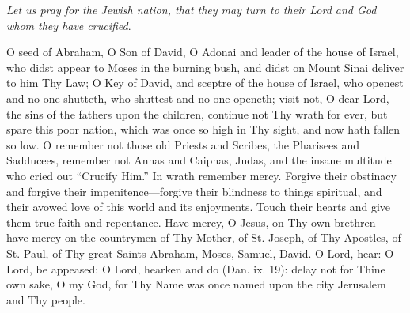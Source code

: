 \emph{Let us pray for the Jewish
nation, that they may turn to their Lord and God whom they have crucified}.

O seed of Abraham, O Son of
David, O Adonai and leader of the house of Israel, who didst appear to
Moses in the burning bush, and didst on Mount Sinai deliver to him Thy
Law; O Key of David, and sceptre of the house of Israel, who openest and
no one shutteth, who shuttest and no one openeth; visit not, O dear
Lord, the sins of the fathers upon the children, continue not Thy wrath
for ever, but spare this poor nation, which was once so high in Thy
sight, and now hath fallen so low. O remember not those old Priests and
Scribes, the Pharisees and Sadducees, remember not Annas and Caiphas,
Judas, and the insane multitude who cried out ``Crucify Him.'' In wrath
remember mercy. Forgive their obstinacy and forgive their
impenitence—forgive their blindness to things spiritual, and their
avowed love of this world and its enjoyments. Touch their hearts and
give them true faith and repentance. Have mercy, O Jesus, on Thy own
brethren—have mercy on the countrymen of Thy Mother, of St. Joseph, of Thy Apostles, of St. Paul, of Thy great Saints Abraham,
Moses, Samuel, David. O Lord, hear: O Lord, be appeased: O Lord, hearken
and do (Dan. ix. 19): delay not for Thine own sake, O my God, for Thy
Name was once named upon the city Jerusalem and Thy people.


